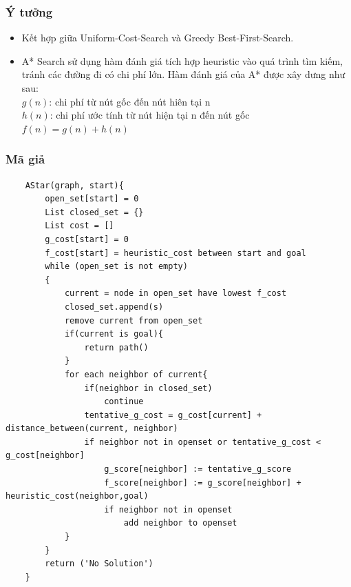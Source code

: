 \documentclass{article}
\begin{document}
\subsubsection{Ý tưởng}
\begin{itemize}
    \item Kết hợp giữa Uniform-Cost-Search và Greedy Best-First-Search. 
    \item A* Search sử dụng hàm đánh giá tích hợp heuristic vào quá trình tìm kiếm, tránh các đường đi có chi phí lớn. Hàm đánh giá của A* được xây dưng như sau:\\
    $g(n)$: chi phí từ nút gốc đến nút hiên tại n\\
    $h(n)$: chi phí ước tính từ nút hiện tại n đến nút gốc \\
    $f(n) = g(n) + h(n)$
\end{itemize}
\subsubsection{Mã giả}
\begin{verbatim}
    AStar(graph, start){
        open_set[start] = 0
        List closed_set = {}
        List cost = []
        g_cost[start] = 0
        f_cost[start] = heuristic_cost between start and goal
        while (open_set is not empty)
        {
            current = node in open_set have lowest f_cost
            closed_set.append(s)  
            remove current from open_set
            if(current is goal){
                return path()
            }
            for each neighbor of current{
                if(neighbor in closed_set)
                    continue
                tentative_g_cost = g_cost[current] + distance_between(current, neighbor)
                if neighbor not in openset or tentative_g_cost < g_cost[neighbor] 
                    g_score[neighbor] := tentative_g_score
                    f_score[neighbor] := g_score[neighbor] + heuristic_cost(neighbor,goal)
                    if neighbor not in openset
                        add neighbor to openset 
            }
        } 
        return ('No Solution')
    }
\end{verbatim}
\end{document}

